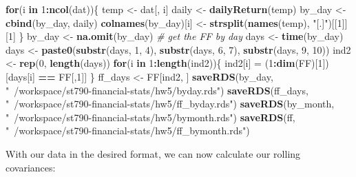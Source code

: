 \documentclass[11pt,]{article}
\newenvironment{Shaded}{\begin{snugshade}}{\end{snugshade}}
\newcommand{\CommentTok}[1]{\textcolor[rgb]{0.56,0.35,0.01}{\textit{#1}}}
\newcommand{\ControlFlowTok}[1]{\textcolor[rgb]{0.13,0.29,0.53}{\textbf{#1}}}
\newcommand{\DecValTok}[1]{\textcolor[rgb]{0.00,0.00,0.81}{#1}}
\newcommand{\KeywordTok}[1]{\textcolor[rgb]{0.13,0.29,0.53}{\textbf{#1}}}
\newcommand{\NormalTok}[1]{#1}
\newcommand{\OperatorTok}[1]{\textcolor[rgb]{0.81,0.36,0.00}{\textbf{#1}}}
\newcommand{\StringTok}[1]{\textcolor[rgb]{0.31,0.60,0.02}{#1}}
\begin{document}
\begin{Shaded}
\begin{Highlighting}[]
\ControlFlowTok{for}\NormalTok{(i }\ControlFlowTok{in} \DecValTok{1}\OperatorTok{:}\KeywordTok{ncol}\NormalTok{(dat))\{}
\NormalTok{  temp <-}\StringTok{ }\NormalTok{dat[, i]}
\NormalTok{  daily <-}\StringTok{ }\KeywordTok{dailyReturn}\NormalTok{(temp)}
\NormalTok{  by_day <-}\StringTok{ }\KeywordTok{cbind}\NormalTok{(by_day, daily)}
  \KeywordTok{colnames}\NormalTok{(by_day)[i] <-}\StringTok{ }\KeywordTok{strsplit}\NormalTok{(}\KeywordTok{names}\NormalTok{(temp), }\StringTok{"[.]"}\NormalTok{)[[}\DecValTok{1}\NormalTok{]][}\DecValTok{1}\NormalTok{]}
\NormalTok{\}}
\NormalTok{by_day <-}\StringTok{ }\KeywordTok{na.omit}\NormalTok{(by_day)}
\CommentTok{# get the FF by day }
\NormalTok{days <-}\StringTok{ }\KeywordTok{time}\NormalTok{(by_day)}
\NormalTok{days <-}\StringTok{ }\KeywordTok{paste0}\NormalTok{(}\KeywordTok{substr}\NormalTok{(days, }\DecValTok{1}\NormalTok{, }\DecValTok{4}\NormalTok{),}
            \KeywordTok{substr}\NormalTok{(days, }\DecValTok{6}\NormalTok{, }\DecValTok{7}\NormalTok{), }
            \KeywordTok{substr}\NormalTok{(days, }\DecValTok{9}\NormalTok{, }\DecValTok{10}\NormalTok{))}
\NormalTok{ind2 <-}\StringTok{ }\KeywordTok{rep}\NormalTok{(}\DecValTok{0}\NormalTok{, }\KeywordTok{length}\NormalTok{(days))}
\ControlFlowTok{for}\NormalTok{(i }\ControlFlowTok{in} \DecValTok{1}\OperatorTok{:}\KeywordTok{length}\NormalTok{(ind2))\{}
\NormalTok{  ind2[i] =}\StringTok{ }\NormalTok{(}\DecValTok{1}\OperatorTok{:}\KeywordTok{dim}\NormalTok{(FF)[}\DecValTok{1}\NormalTok{])[days[i] }\OperatorTok{==}\StringTok{ }\NormalTok{FF[,}\DecValTok{1}\NormalTok{]]}
\NormalTok{\}}
\NormalTok{ff_days <-}\StringTok{ }\NormalTok{FF[ind2, ]}
\KeywordTok{saveRDS}\NormalTok{(by_day, }\StringTok{"~/workspace/st790-financial-stats/hw5/byday.rds"}\NormalTok{)}
\KeywordTok{saveRDS}\NormalTok{(ff_days, }\StringTok{"~/workspace/st790-financial-stats/hw5/ff_byday.rds"}\NormalTok{)}
\KeywordTok{saveRDS}\NormalTok{(by_month, }\StringTok{"~/workspace/st790-financial-stats/hw5/bymonth.rds"}\NormalTok{)}
\KeywordTok{saveRDS}\NormalTok{(ff, }\StringTok{"~/workspace/st790-financial-stats/hw5/ff_bymonth.rds"}\NormalTok{)}
\end{Highlighting}
\end{Shaded}

With our data in the desired format, we can now calculate our rolling
covariances:
\end{document}
